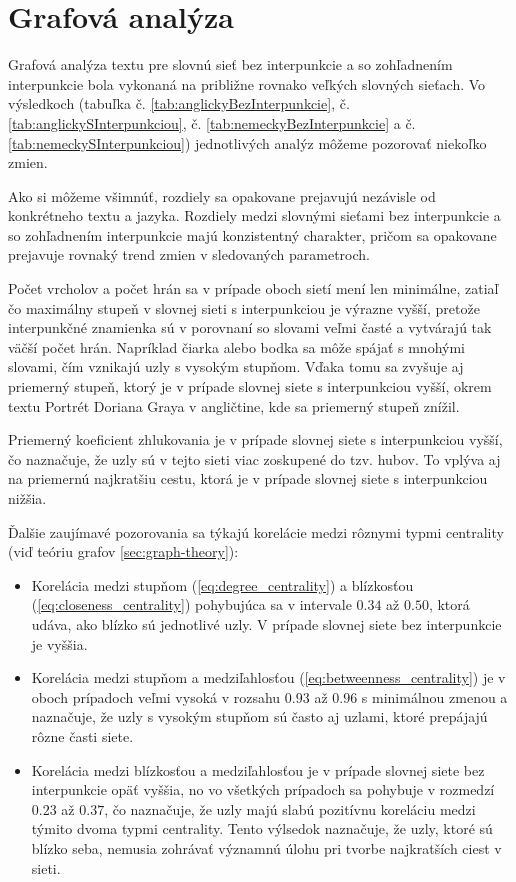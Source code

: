 \clearpage

\section{Grafová analýza}\label{sec:grafovaAnalyza}

Grafová analýza textu pre slovnú sieť bez interpunkcie a so zohľadnením interpunkcie bola vykonaná na približne rovnako veľkých slovných sieťach.
Vo výsledkoch (tabuľka č. \ref{tab:anglickyBezInterpunkcie}, č. \ref{tab:anglickySInterpunkciou}, č. \ref{tab:nemeckyBezInterpunkcie} a č. \ref{tab:nemeckySInterpunkciou})
jednotlivých analýz môžeme pozorovať niekoľko zmien.

Ako si môžeme všimnúť, rozdiely sa opakovane prejavujú nezávisle od konkrétneho textu a jazyka. Rozdiely medzi slovnými sieťami bez interpunkcie a so zohľadnením interpunkcie
majú konzistentný charakter, pričom sa opakovane prejavuje rovnaký trend zmien v sledovaných parametroch.

Počet vrcholov a počet hrán sa v prípade oboch sietí mení len minimálne, zatiaľ čo maximálny stupeň v slovnej sieti s interpunkciou je výrazne vyšší, pretože
interpunkčné znamienka sú v porovnaní so slovami veľmi časté a vytvárajú tak väčší počet hrán. Napríklad čiarka alebo bodka sa môže spájať s mnohými slovami, čím vznikajú
uzly s vysokým stupňom. Vďaka tomu sa zvyšuje aj priemerný stupeň, ktorý je v prípade slovnej siete s interpunkciou vyšší, okrem textu Portrét Doriana Graya v angličtine, kde sa
priemerný stupeň znížil. 

Priemerný koeficient zhlukovania je v prípade slovnej siete s interpunkciou vyšší, čo naznačuje, že uzly sú v tejto sieti viac zoskupené do tzv. hubov. To vplýva aj na 
priemernú najkratšiu cestu, ktorá je v prípade slovnej siete s interpunkciou nižšia.

Ďalšie zaujímavé pozorovania sa týkajú korelácie medzi rôznymi typmi centrality (viď teóriu grafov \ref{sec:graph-theory}):
\begin{itemize}
    \item Korelácia medzi stupňom (\ref{eq:degree_centrality}) a blízkosťou (\ref{eq:closeness_centrality}) pohybujúca sa v intervale $0.34$ až $0.50$, ktorá udáva, ako blízko sú jednotlivé uzly.
          V prípade slovnej siete bez interpunkcie je vyššia.
    \item Korelácia medzi stupňom a medziľahlosťou (\ref{eq:betweenness_centrality}) je v oboch prípadoch veľmi vysoká v rozsahu $0.93$ až $0.96$ s minimálnou zmenou a naznačuje, že uzly s vysokým stupňom
          sú často aj uzlami, ktoré prepájajú rôzne časti siete.
    \item Korelácia medzi blízkosťou a medziľahlosťou je v prípade slovnej siete bez interpunkcie opäť vyššia, no vo všetkých prípadoch sa
          pohybuje v rozmedzí $0.23$ až $0.37$, čo naznačuje, že uzly majú slabú pozitívnu koreláciu medzi týmito dvoma typmi centrality. Tento výlsedok naznačuje, že uzly, ktoré sú blízko seba,
          nemusia zohrávať významnú úlohu pri tvorbe najkratších ciest v sieti.
\end{itemize}

